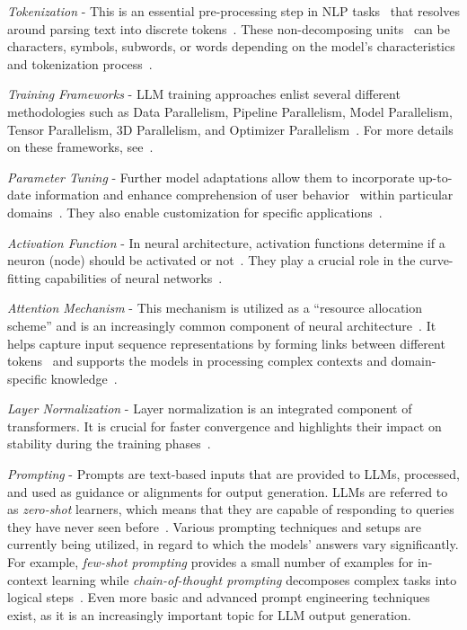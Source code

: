 \documentclass{DESSThesis}
\begin{document}
\noindent\emph{Tokenization} - This is an essential pre-processing step in NLP tasks~\cite{schmidt2024tokenizationcompression} that resolves around parsing text into discrete tokens~\cite{singh2024tokenizationcountsimpacttokenization}. These non-decomposing units~\cite{naveed2024comprehensiveoverviewlargelanguage} can be characters, symbols, subwords, or words depending on the model's characteristics and tokenization process~\cite{review10433480,naveed2024comprehensiveoverviewlargelanguage,10.1145/3624724}.

\noindent\emph{Training Frameworks} - LLM training approaches enlist several different methodologies such as Data Parallelism, Pipeline Parallelism, Model Parallelism, Tensor Parallelism, 3D Parallelism, and Optimizer Parallelism~\cite{review10433480,naveed2024comprehensiveoverviewlargelanguage}. For more details on these frameworks, see~\cite{naveed2024comprehensiveoverviewlargelanguage}.

\noindent\emph{Parameter Tuning} - Further model adaptations allow them to incorporate up-to-date information and enhance comprehension of user behavior~\cite{10.1145/3626772.3657807} within particular domains~\cite{bdcc9040087}. They also enable customization for specific applications~\cite{review10433480,bdcc9040087}.

\noindent\emph{Activation Function} - In neural architecture, activation functions determine if a neuron (node) should be activated or not~\cite{ignijic2024evaluating}. They play a crucial role in the curve-fitting capabilities of neural networks~\cite{activationfunction}.

\noindent\emph{Attention Mechanism} - This mechanism is utilized as a \enquote{resource allocation scheme} and is an increasingly common component of neural architecture~\cite{NIU202148}. It helps capture input sequence representations by forming links between different tokens~\cite{review10433480,11027973} and supports the models in processing complex contexts and domain-specific knowledge~\cite{guan2025attentionmechanismsperspectiveexploring}.

\noindent\emph{Layer Normalization} - Layer normalization is an integrated component of transformers. It is crucial for faster convergence and highlights their impact on stability during the training phases~\cite{review10433480,naveed2024comprehensiveoverviewlargelanguage}.

\noindent\emph{Prompting} - Prompts are text-based inputs that are provided to LLMs, processed, and used as guidance or alignments for output generation. LLMs are referred to as \emph{zero-shot} learners, which means that they are capable of responding to queries they have never seen before~\cite{naveed2024comprehensiveoverviewlargelanguage,bhandari2024surveypromptingtechniquesllms}.
Various prompting techniques and setups are currently being utilized, in regard to which the models' answers vary significantly. For example, \emph{few-shot prompting} provides a small number of examples for in-context learning while \emph{chain-of-thought prompting} decomposes complex tasks into logical steps~\cite{bhandari2024surveypromptingtechniquesllms}. Even more basic and advanced prompt engineering techniques exist, as it is an increasingly important topic for LLM output generation.
\end{document}

